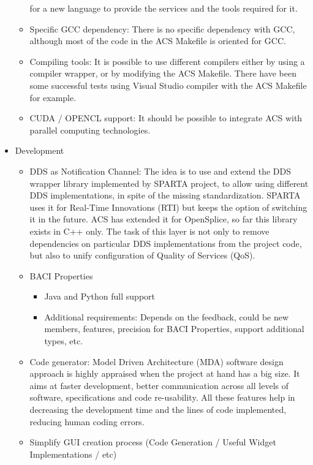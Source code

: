 \begin{itemize}
\begin{itemize}
			for a new language to provide the services and the tools required for it.
		\item Specific GCC dependency: There is no specific dependency with GCC, although most of the code in the ACS Makefile is oriented for GCC.
		\item Compiling tools: It is possible to use different compilers either by using a compiler wrapper, or by modifying the 
			ACS Makefile. There have been some successful tests using Visual Studio compiler with the ACS Makefile for example.
		\item CUDA / OPENCL support: It should be possible to integrate ACS with parallel computing technologies.
	\end{itemize}
	\item Development
	\begin{itemize}
		\item DDS as Notification Channel: The idea is to use and extend the DDS wrapper library implemented by SPARTA project, to allow using different DDS 
			implementations, in spite of the missing standardization. SPARTA uses it for Real-Time Innovations (RTI) but keeps the option of switching it 
			in the future. ACS has extended it for OpenSplice, so far this library exists in C++ only. The task of this layer is not only to remove 
			dependencies on particular DDS implementations from the project code, but also to unify configuration of Quality of Services (QoS). 
		\item BACI Properties
		\begin{itemize}
			\item Java and Python full support
			\item Additional requirements: Depends on the feedback, could be new members, features, precision for BACI Properties, support additional 
				types, etc.
		\end{itemize}
		\item Code generator: Model Driven Architecture (MDA) software design approach is highly appraised when the project at hand has a big size. It aims
			at faster development, better communication across all levels of software, specifications and code re-usability. All these features help in
			decreasing the development time and the lines of code implemented, reducing human coding errors. 
		\item Simplify GUI creation process (Code Generation / Useful Widget Implementations / etc)
	\end{itemize}
\end{itemize}
